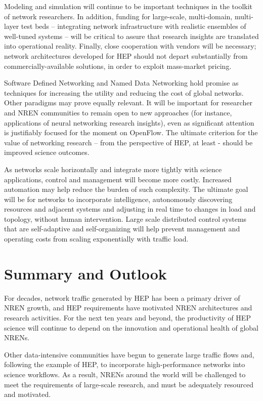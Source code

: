 Modeling and simulation will continue to be important techniques in the toolkit of network researchers. In addition, funding for large-scale, multi-domain, multi-layer test beds – integrating network infrastructure with realistic ensembles of well-tuned systems – will be critical to assure that research insights are translated into operational reality. Finally, close cooperation with vendors will be necessary; network architectures developed for HEP should not depart substantially from commercially-available solutions, in order to exploit mass-market pricing.  

Software Defined Networking\cite{SDN} and Named Data Networking\cite{NDN} hold promise as techniques for increasing the utility and reducing the cost of global networks.  Other paradigms may prove equally relevant. It will be important for researcher and NREN communities to remain open to new approaches (for instance, applications of neural networking research insights), even as significant attention is justifiably focused for the moment on OpenFlow. The ultimate criterion for the value of networking research – from the perspective of HEP, at least - should be improved science outcomes.  

As networks scale horizontally and integrate more tightly with science applications, control and management will become more costly. Increased automation may help reduce the burden of such complexity. The ultimate goal will be for networks to incorporate intelligence, autonomously discovering resources and adjacent systems and adjusting in real time to changes in load and topology, without human intervention. Large scale distributed control systems that are self-adaptive and self-organizing will help prevent management and operating costs from scaling exponentially with traffic load. 

\section{Summary and Outlook}
\label{sec:comp-summary}

For decades, network traffic generated by HEP has been a primary driver of NREN growth, and HEP requirements have motivated NREN architectures and research activities. For the next ten years and beyond, the productivity of HEP science will continue to depend on the innovation and operational health of global NRENs. 

Other data-intensive communities have begun to generate large traffic flows and, following the example of HEP, to incorporate high-performance networks into science workflows. As a result, NRENs around the world will be challenged to meet the requirements of large-scale research, and must be adequately resourced and motivated.
 
